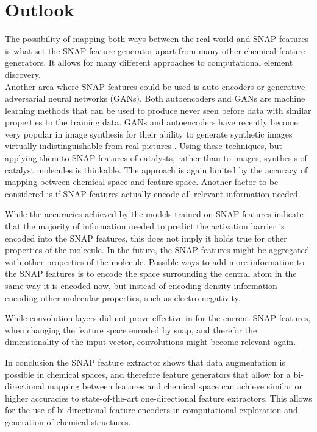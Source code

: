 \section{Outlook}

The possibility of mapping both ways between the real world and SNAP features is what set the SNAP feature generator apart 
from many other chemical feature generators.
It allows for many different approaches to computational element discovery.
\\
Another area where SNAP features could be used is auto encoders or generative adversarial neural networks (GANs).
Both autoencoders and GANs are machine learning methods that can be used to produce never seen before data with similar properties
to the training data.
GANs and autoencoders have recently become very popular in image synthesis for their ability to generate synthetic images 
virtually indistinguishable from real pictures \cite{karras2019stylebased} .
Using these techniques, but applying them to SNAP features of catalysts, rather than to images, synthesis 
of catalyst molecules is thinkable.
The approach is again limited by the accuracy of mapping between chemical space and feature space.
Another factor to be considered is if SNAP features actually encode all relevant information needed.

While the accuracies achieved by the models trained on SNAP features indicate that 
the majority of information needed to predict the activation barrier is encoded into the SNAP features, this does
not imply it holds true for other properties of the molecule.
In the future, the SNAP features might be aggregated with other properties of the molecule.
Possible ways to add more information to the SNAP features is to encode the space surrounding the 
central atom in the same way it is encoded now, but instead of encoding density information encoding 
other molecular properties, such as electro negativity.

While convolution layers did not prove effective in for the current SNAP features,
when changing the feature space encoded by snap, and therefor the dimensionality of the input vector,
convolutions might become relevant again.

In conclusion the SNAP feature extractor shows that data augmentation is possible in chemical spaces, and therefore 
feature generators that allow for a bi-directional mapping between features and chemical space can achieve similar or higher
accuracies to state-of-the-art one-directional feature extractors.
This allows for the use of bi-directional feature encoders in computational exploration and generation of chemical structures.
